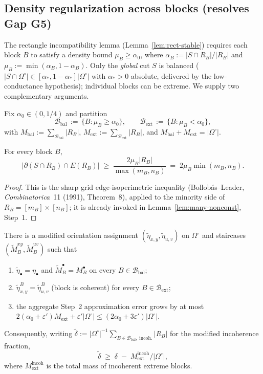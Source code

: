 \subsection{Density regularization across blocks (resolves Gap G5)}
\label{subsec:G5-step4}

The rectangle incompatibility lemma (Lemma~\ref{lem:rect-stable}) requires
each block $B$ to satisfy a density bound $\mu_B\ge\alpha_0$, where
$\alpha_B:=|S\cap R_B|/|R_B|$ and $\mu_B:=\min(\alpha_B,1-\alpha_B)$. Only
the \emph{global} cut $S$ is balanced
($|S\cap\Omega^\circ|\in[\alpha_*,1-\alpha_*]|\Omega^\circ|$ with
$\alpha_*>0$ absolute, delivered by the low-conductance hypothesis);
individual blocks can be extreme. We supply two complementary arguments.

Fix $\alpha_0\in(0,1/4)$ and partition
\[
\mathcal B_{\mathrm{bal}}\,:=\,\{B:\mu_B\ge\alpha_0\},\qquad
\mathcal B_{\mathrm{ext}}\,:=\,\{B:\mu_B<\alpha_0\},
\]
with $M_{\mathrm{bal}}:=\sum_{\mathcal B_{\mathrm{bal}}}|R_B|$,
$M_{\mathrm{ext}}:=\sum_{\mathcal B_{\mathrm{ext}}}|R_B|$, and
$M_{\mathrm{bal}}+M_{\mathrm{ext}}=|\Omega^\circ|$.

\begin{lemma}\label{lem:G5-iso}
For every block $B$,
\[
|\partial(S\cap R_B)\cap E(R_B)|
\;\ge\;\frac{2\mu_B|R_B|}{\max(m_B,n_B)}
\;=\;2\mu_B\min(m_B,n_B).
\]
\end{lemma}

\begin{proof}
This is the sharp grid edge-isoperimetric inequality
(Bollob\'as--Leader, \emph{Combinatorica}~11 (1991), Theorem~8), applied
to the minority side of $R_B=[m_B]\times[n_B]$; it is already invoked in
Lemma~\ref{lem:many-nonconst}, Step~1.
\end{proof}

\begin{lemma}
\label{lem:G5-abs}
There is a modified orientation assignment
$(\tilde\eta_{x,y},\tilde\eta_{u,v})$ on $\Omega^\circ$ and staircases
$(\tilde M_B^{xy},\tilde M_B^{uv})$ such that
\begin{enumerate}[label=\textup{(\roman*)}]
\item $\tilde\eta_\bullet=\eta_\bullet$ and
$\tilde M_B^\bullet=M_B^\bullet$ on every $B\in\mathcal B_{\mathrm{bal}}$;
\item $\tilde\eta_{x,y}^B=\tilde\eta_{u,v}^B$ (block is coherent) for
every $B\in\mathcal B_{\mathrm{ext}}$;
\item the aggregate Step~2 approximation error grows by at most
$2(\alpha_0+\varepsilon')M_{\mathrm{ext}}+\varepsilon'|\Omega^\circ|\le(2\alpha_0+3\varepsilon')|\Omega^\circ|$.
\end{enumerate}
Consequently, writing
$\tilde\delta:=|\Omega^\circ|^{-1}\sum_{B\in\mathcal B_{\mathrm{bal}},\ \text{incoh.}}|R_B|$
for the modified incoherence fraction,
\[
\tilde\delta\;\ge\;\delta\;-\;M_{\mathrm{ext}}^{\mathrm{incoh}}/|\Omega^\circ|,
\]
where $M_{\mathrm{ext}}^{\mathrm{incoh}}$ is the total mass of incoherent
extreme blocks.
\end{lemma}

